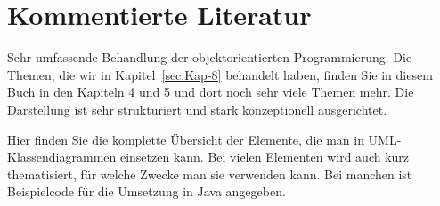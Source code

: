 \section{Kommentierte Literatur}
\label{sec:Kap-8.7}



{Sehr umfassende Behandlung der objektorientierten Programmierung. Die Themen, die wir in Kapitel~\ref{sec:Kap-8} behandelt haben, finden Sie in diesem Buch in den Kapiteln 4 und 5 und dort noch sehr viele Themen mehr. Die Darstellung ist sehr strukturiert und stark konzeptionell ausgerichtet.} 

{Hier finden Sie die komplette Übersicht der Elemente, die man in UML-Klassen\-dia\-gram\-men einsetzen kann. Bei vielen Elementen wird auch kurz thematisiert, für welche Zwecke man sie verwenden kann. Bei manchen ist Beispielcode für die Umsetzung in Java angegeben.}


